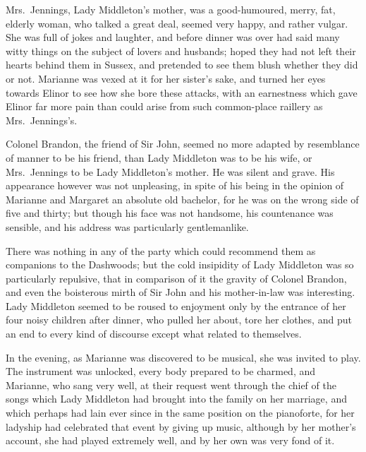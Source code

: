 Mrs.\ Jennings, Lady Middleton's mother, was a
good-humoured, merry, fat, elderly woman, who talked a
great deal, seemed very happy, and rather vulgar.  She was full
of jokes and laughter, and before dinner was over had said
many witty things on the subject of lovers and husbands;
hoped they had not left their hearts behind them in Sussex,
and pretended to see them blush whether they did or not.
Marianne was vexed at it for her sister's sake, and turned
her eyes towards Elinor to see how she bore these attacks,
with an earnestness which gave Elinor far more pain than
could arise from such common-place raillery as Mrs.\ Jennings's.

Colonel Brandon, the friend of Sir John, seemed no
more adapted by resemblance of manner to be his friend,
than Lady Middleton was to be his wife, or Mrs.\ Jennings
to be Lady Middleton's mother.  He was silent and grave.
His appearance however was not unpleasing, in spite
of his being in the opinion of Marianne and Margaret
an absolute old bachelor, for he was on the wrong side
of five and thirty; but though his face was not handsome,
his countenance was sensible, and his address was
particularly gentlemanlike.

There was nothing in any of the party which could
recommend them as companions to the Dashwoods; but the cold
insipidity of Lady Middleton was so particularly repulsive,
that in comparison of it the gravity of Colonel Brandon,
and even the boisterous mirth of Sir John and his
mother-in-law was interesting.  Lady Middleton seemed
to be roused to enjoyment only by the entrance of her
four noisy children after dinner, who pulled her about,
tore her clothes, and put an end to every kind of discourse
except what related to themselves.

In the evening, as Marianne was discovered to be musical,
she was invited to play.  The instrument was unlocked,
every body prepared to be charmed, and Marianne,
who sang very well, at their request went through the
chief of the songs which Lady Middleton had brought into
the family on her marriage, and which perhaps had lain
ever since in the same position on the pianoforte,
for her ladyship had celebrated that event by giving
up music, although by her mother's account, she had
played extremely well, and by her own was very fond of it.

